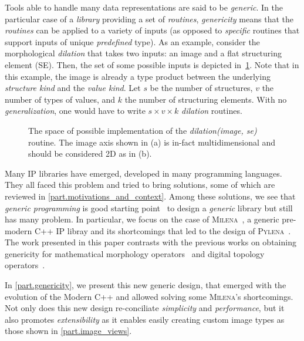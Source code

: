 Tools able to handle many data representations are said to be \emph{generic}. In the particular case of a \emph{library}
providing a set of \emph{routines}, \emph{genericity} means that the \emph{routines} can be applied to a variety of
inputs (as opposed to \emph{specific} routines that support inputs of unique \emph{predefined} type). As an example,
consider the morphological \emph{dilation} that takes two inputs: an image and a flat structuring element (SE). Then,
the set of some possible inputs is depicted in~\cref{fig.espaceSAV}. Note that in this example, the image is already a
type product between the underlying \emph{structure kind} and the \emph{value kind}. Let $s$ be the number of
structures, $v$ the number of types of values, and $k$ the number of structuring elements. With no
\emph{generalization}, one would have to write $s \times v \times k$ \emph{dilation} routines.

\begin{figure}[htbp]
  \centering
  \subcaptionbox{}{}
  \subcaptionbox{}{}
  \caption{The space of possible implementation of the \emph{dilation(image, se)}
    routine. The image axis shown in (a) is in-fact multidimensional and should
    be considered 2D as in (b).}
  \label{fig.espaceSAV}
\end{figure}

Many IP libraries have emerged, developed in many programming languages. They all faced this problem and tried to bring
solutions, some of which are reviewed in \cref{part.motivations_and_context}. Among these solutions, we see that
\emph{generic programming} is good starting point~\cite{geraud.2000.icpr} to design a \emph{generic} library but still
has many problem. In particular, we focus on the case of \textsc{Milena}~\cite{levillain.2010.icip,
  geraud.2012.ipolmeeting}, a generic pre-modern C++ IP libray and its shortcomings that led to the design of
\textsc{Pylena}~\cite{carlinet.2018.pylena}.  The work presented in this paper contrasts with the previous works on
obtaining genericity for mathematical morphology operators~\cite{darbon.2002.ismm,levillain.2009.ismm} and digital
topology operators~\cite{levillain.2012.wadgmm-lncs}.

In \cref{part.genericity}, we present this new generic design, that emerged with the evolution of the Modern C++ and
allowed solving some \textsc{Milena}'s shortcomings. Not only does this new design re-conciliate \emph{simplicity} and
\emph{performance}, but it also promotes \emph{extensibility} as it enables easily creating custom image types as those
shown in \cref{part.image_views}.